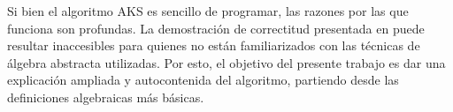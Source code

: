 Si bien el algoritmo AKS es sencillo de programar, las razones por las que funciona son profundas. La demostración de correctitud presentada en \cite{AKS04} puede resultar inaccesibles para quienes no están familiarizados con las técnicas de álgebra abstracta utilizadas. Por esto, el objetivo del presente trabajo es dar una explicación ampliada y autocontenida del algoritmo, partiendo desde las definiciones algebraicas más básicas.
